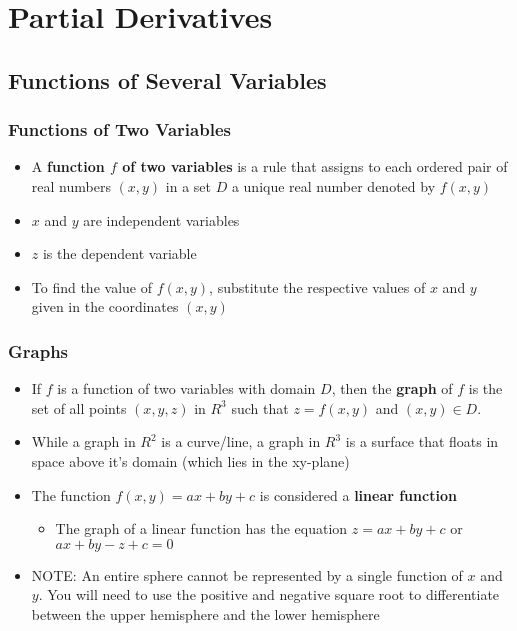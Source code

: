 \documentclass{package/notes}
\begin{document}
\chapter{Partial Derivatives}

\section{Functions of Several Variables}

\subsection{Functions of Two Variables}

\begin{itemize}
	\item A \textbf{function $f$ of two variables} is a rule that assigns to each ordered pair of real numbers $(x,y)$ in a set $D$ a unique real number denoted by $f(x,y)$
	\item $x$ and $y$ are independent variables
	\item $z$ is the dependent variable
	\item To find the value of $f(x,y)$, substitute the respective values of $x$ and $y$ given in the coordinates $(x,y)$
\end{itemize}

\subsection{Graphs}

\begin{itemize}
	\item If $f$ is a function of two variables with domain $D$, then the \textbf{graph} of $f$ is the set of all points $(x,y,z)$ in $R^3$ such that $z=f(x,y)$ and $(x,y) \in D$.
	\item While a graph in $R^2$ is a curve/line, a graph in $R^3$ is a surface that floats in space above it's domain (which lies in the xy-plane)
	\item The function $f(x,y) = ax+by+c$ is considered a \textbf{linear function}
	\begin{itemize}
		\item The graph of a linear function has the equation $z = ax+by+c$ or $ax+by-z+c=0$
	\end{itemize}
	\item NOTE: An entire sphere cannot be represented by a single function of $x$ and $y$. You will need to use the positive and negative square root to differentiate between the upper hemisphere and the lower hemisphere
\end{itemize}
\end{document}
